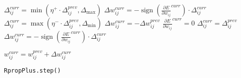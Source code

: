 \begin{algorithm}
    \BlankLine
    \BlankLine

     { \BlankLine
         { \BlankLine \BlankLine
            $\Delta_{ij}^{curr} = \min(\eta^{+} \cdot \Delta_{ij}^{prev}, \Delta_{\max})$ \BlankLine
            $\Delta w_{ij}^{curr} = -\operatorname{sign}(\frac{\partial E}{\partial w_{ij}}^{curr}) \cdot \Delta_{ij}^{curr}$
        }
         { \BlankLine \BlankLine
            $\Delta_{ij}^{curr} = \max(\eta^{-} \cdot \Delta_{ij}^{prev}, \Delta_{\min})$ \BlankLine
            $\Delta w_{ij}^{curr} = -\Delta w_{ij}^{prev}$ \BlankLine
            ${\frac{\partial E}{\partial w_{ij}}}^{curr} = 0$
        }
         { \BlankLine \BlankLine
            $\Delta_{ij}^{curr} = \Delta_{ij}^{prev}$ \BlankLine
            $\Delta w_{ij}^{curr} = -\operatorname{sign}(\frac{\partial E}{\partial w_{ij}}^{curr}) \cdot \Delta_{ij}^{curr}$
        } \BlankLine \BlankLine

        $w_{ij}^{curr} = w_{ij}^{prev} + \Delta w_{ij}^{curr}$
    }

    \caption{\texttt{RpropPlus.step()}}
    \label{alg:rpropplus}
\end{algorithm}